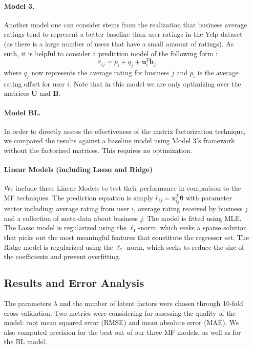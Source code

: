 \documentclass[12pt]{article}
\newcommand{\mbf}[1]{\mathbf{#1}}
\begin{document}
\paragraph{Model 3.} Another model one can consider stems from the realization that business average ratings tend to represent a better baseline than user ratings in the Yelp dataset (as there is a large number of users that have a small amount of ratings). As such, it is helpful to consider a prediction model of the following form \cite{funk06}:
\begin{equation}
\hat r_{ij} =  p_i + q_j + \mbf u_i^T\mbf b_j
\end{equation}
where $q_j$ now represents the average rating for business $j$ and $p_i$ is the average rating offset for user $i$. Note that in this model we are only optimizing over the matrices $\mbf U$ and $\mbf B$. 

\paragraph{Model BL.} In order to directly assess the effectiveness of the matrix factorization technique, we compared the results against a baseline model using Model 3's framework without the factorized matrices. This requires no optimization.

\paragraph{Linear Models (including Lasso and Ridge)} We include three Linear Models to test their performance in comparison to the MF techniques. The prediction equation is simply $\hat r_{ij}=\mbf x_{ij}^T\boldsymbol\theta$ with parameter vector including: average rating from user $i$, average rating received by business $j$ and a collection of meta-data about business $j$. The model is fitted using MLE. The Lasso model is regularized using the $\ell_1$-norm, which seeks a sparse solution that picks out the most meaningful features that constitute the regressor set. The Ridge model is regularized using the $\ell_2$-norm, which seeks to reduce the size of the coefficients and prevent overfitting.

\subsection{Results and Error Analysis}
The parameters $\lambda$ and the number of latent factors were chosen through 10-fold cross-validation. Two metrics were considering for assessing the quality of the model: root mean squared error (RMSE) and mean absolute error (MAE). We also computed precision for the best out of our three MF models, as well as for the BL model.
\end{document}
